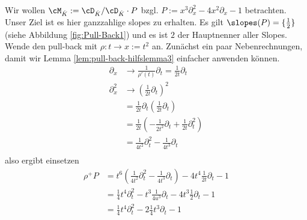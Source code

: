 \begin{exmp}
Wir wollen $\cM_{\hat K}:=\cD_{\hat K}/\cD_{\hat K}\cdot P$ bzgl. $P:=
x^3\partial_x^2-4x^2\partial_x-1$ betrachten.
Unser Ziel ist es hier ganzzahlige slopes zu erhalten.
Es gilt $\slopes(P)=\{\frac{1}{2}\}$ (siehe Abbildung \ref{fig:Pull-Back1})
und es ist $2$ der Hauptnenner aller Slopes.
Wende den pull-back mit $\rho:t\rightarrow x:=t^2$ an.
Zunächst ein paar Nebenrechnungen, damit wir Lemma
\ref{lem:pull-back-hilfslemma3} einfacher anwenden können.
\begin{align*}
\partial_x   &\rightarrow \frac{1}{\rho'(t)}\partial_t=\frac{1}{2t}\partial_t \\
\partial_x^2 &\rightarrow (\frac{1}{2t}\partial_t)^2 \\
             &= \frac{1}{2t}\partial_t (\frac{1}{2t}\partial_t) \\
             &= \frac{1}{2t}(-\frac{1}{2t^2}\partial_t +
               \frac{1}{2t}\partial_t^2) \\
             &= \frac{1}{4t^2}\partial_t^2-\frac{1}{4t^3}\partial_t \\
\end{align*}
also ergibt einsetzen
\begin{align*}
\rho^+P &= t^6(\frac{1}{4t^2}\partial_t^2-\frac{1}{4t^3}\partial_t)-
          4t^{4}\frac{1}{2t}\partial_t-1\\
        &= \frac{1}{4}t^4\partial_t^2-t^3\frac{1}{4u^3}\partial_t-
          4t^{3}\frac{1}{2}\partial_t-1\\
        &= \frac{1}{4}t^4\partial_t^2 -2\frac{1}{4}t^3\partial_t-1
\end{align*}


\end{exmp}
